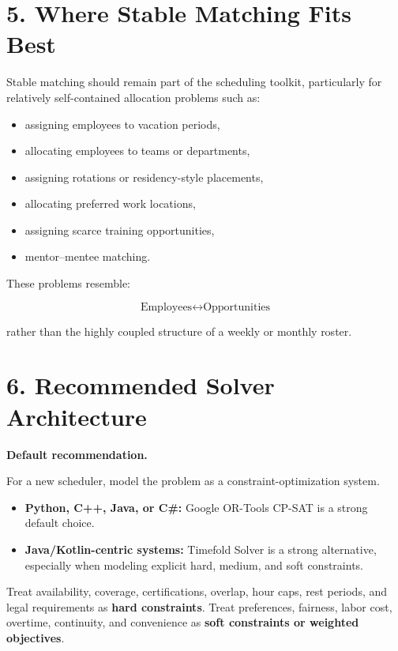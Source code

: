 \documentclass[11pt]{article}
\begin{document}
\section{5. Where Stable Matching Fits Best}

Stable matching should remain part of the scheduling toolkit, particularly for relatively self-contained allocation problems such as:

\begin{itemize}
  \item assigning employees to vacation periods,
  \item allocating employees to teams or departments,
  \item assigning rotations or residency-style placements,
  \item allocating preferred work locations,
  \item assigning scarce training opportunities,
  \item mentor--mentee matching.
\end{itemize}

These problems resemble:

\[
\text{Employees} \leftrightarrow \text{Opportunities}
\]

rather than the highly coupled structure of a weekly or monthly roster.

\section{6. Recommended Solver Architecture}

\begin{recommendbox}
\textbf{Default recommendation.}

For a new scheduler, model the problem as a constraint-optimization system.

\begin{itemize}
  \item \textbf{Python, C++, Java, or C\#:} Google OR-Tools CP-SAT is a strong default choice.
  \item \textbf{Java/Kotlin-centric systems:} Timefold Solver is a strong alternative, especially when modeling explicit hard, medium, and soft constraints.
\end{itemize}

Treat availability, coverage, certifications, overlap, hour caps, rest periods, and legal requirements as \textbf{hard constraints}. Treat preferences, fairness, labor cost, overtime, continuity, and convenience as \textbf{soft constraints or weighted objectives}.
\end{recommendbox}
\end{document}
